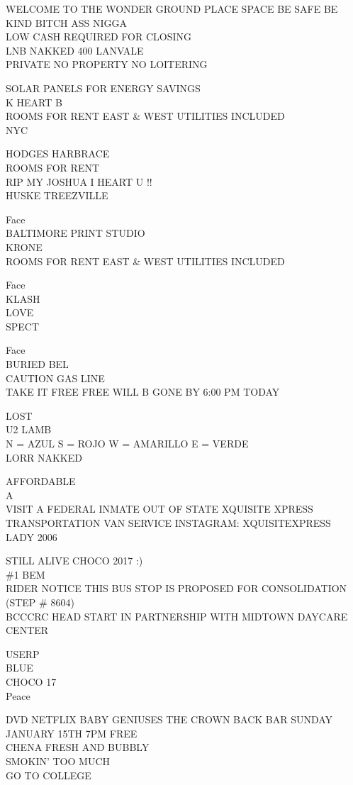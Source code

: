 \documentclass[10pt,letterpaper]{article}
\begin{document}
WELCOME TO THE WONDER GROUND PLACE SPACE BE SAFE BE KIND BITCH ASS NIGGA\\
LOW CASH REQUIRED FOR CLOSING\\
LNB NAKKED 400 LANVALE\\
PRIVATE NO PROPERTY NO LOITERING

SOLAR PANELS FOR ENERGY SAVINGS\\
K HEART B\\
ROOMS FOR RENT EAST \& WEST UTILITIES INCLUDED\\
NYC

HODGES HARBRACE\\
ROOMS FOR RENT\\
RIP MY JOSHUA I HEART U !!\\
HUSKE TREEZVILLE

Face\\
BALTIMORE PRINT STUDIO\\
KRONE\\
ROOMS FOR RENT EAST \& WEST UTILITIES INCLUDED

Face\\
KLASH\\
LOVE\\
SPECT

Face\\
BURIED BEL\\
CAUTION GAS LINE\\
TAKE IT FREE FREE WILL B GONE BY 6:00 PM TODAY

LOST\\
U2 LAMB\\
N = AZUL S = ROJO W = AMARILLO E = VERDE\\
LORR NAKKED

AFFORDABLE\\
A\\
VISIT A FEDERAL INMATE OUT OF STATE XQUISITE XPRESS TRANSPORTATION VAN SERVICE  INSTAGRAM: XQUISITEXPRESS\\
LADY 2006

STILL ALIVE CHOCO 2017 :)\\
\#1 BEM\\
RIDER NOTICE THIS BUS STOP IS PROPOSED FOR CONSOLIDATION (STEP \# 8604)\\
BCCCRC HEAD START IN PARTNERSHIP WITH MIDTOWN DAYCARE CENTER

USERP\\
BLUE\\
CHOCO 17\\
Peace

DVD NETFLIX BABY GENIUSES THE CROWN BACK BAR SUNDAY JANUARY 15TH 7PM FREE\\
CHENA FRESH AND BUBBLY\\
SMOKIN' TOO MUCH\\
GO TO COLLEGE
\end{document}
